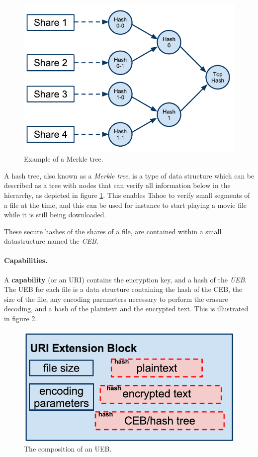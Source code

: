 \documentclass[english,12pt,a4paper]{book}
\begin{document}
\begin{figure}[h]
    \centering
    \includegraphics[width=0.9\columnwidth]{Tahoe-MerkleTree.pdf}
    \caption{Example of a Merkle tree.}
    \label{fig:tahoemerkletree}
\end{figure}

A hash tree, also known as a \emph{Merkle tree}, is a type of data structure
which can be described as a tree with nodes that can verify all information
below in the hierarchy, as depicted in figure \ref{fig:tahoemerkletree}. This
enables Tahoe to verify small segments of a file at the time, and this can be
used for instance to start playing a movie file while it is still being
downloaded.

These secure hashes of the shares of a file, are contained within a small
datastructure named the \emph{\ac{CEB}}.

\paragraph{Capabilities.}

A \textbf{capability} (or an URI) contains the encryption key, and a hash of the
\emph{\ac{UEB}}. The \ac{UEB} for each file is a data structure containing the
hash of the \ac{CEB}, the size of the file, any encoding parameters necessary to
perform the erasure decoding, and a hash of the plaintext and the encrypted
text. This is illustrated in figure \ref{fig:tahoeueb}.

\begin{figure}[!h]
    \centering
    \includegraphics[width=0.9\columnwidth]{Tahoe-UEB.pdf}
    \caption{The composition of an \ac{UEB}.}
    \label{fig:tahoeueb}
\end{figure}
\end{document}

